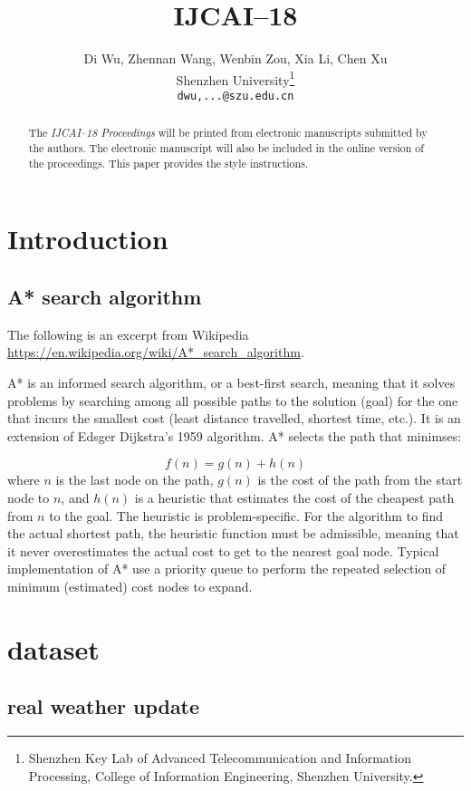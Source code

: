 \documentclass{article}
\title{IJCAI--18}
\author{Di Wu, Zhennan Wang, Wenbin Zou, Xia Li, Chen Xu\\
Shenzhen University\thanks{Shenzhen Key Lab of Advanced Telecommunication and Information Processing, College of Information Engineering, Shenzhen University.}\\
{\tt\small dwu,...@szu.edu.cn}}
\begin{document}
\maketitle

\begin{abstract}
  The {\it IJCAI--18 Proceedings} will be printed from electronic
  manuscripts submitted by the authors. The electronic manuscript will
  also be included in the online version of the proceedings. This paper
  provides the style instructions.
\end{abstract}

\section{Introduction}



\subsection{A* search algorithm}

The following is an excerpt from Wikipedia \url{https://en.wikipedia.org/wiki/A*_search_algorithm}.

A* is an informed search algorithm, or a best-first search, meaning that it solves problems by searching among all possible paths to the solution (goal) for the one that incurs the smallest cost (least distance travelled, shortest time, etc.). It is an extension of Edsger Dijkstra's 1959 algorithm. A* selects the path that minimses:

\begin{equation}
f(n) = g(n) + h(n)
\end{equation}
where $n$ is the last node on the path, $g(n)$ is the cost of the path from the start node to $n$, and $h(n)$ is a heuristic that estimates the cost of the cheapest path from $n$ to the goal.
The heuristic is problem-specific. For the algorithm to find the actual shortest path, the heuristic function must be admissible, meaning that it never overestimates the actual cost to get to the nearest goal node.
Typical implementation of A* use a priority queue to perform the repeated selection of minimum (estimated) cost nodes to expand.




\section{dataset}
 \subsection{real weather update}
\end{document}
